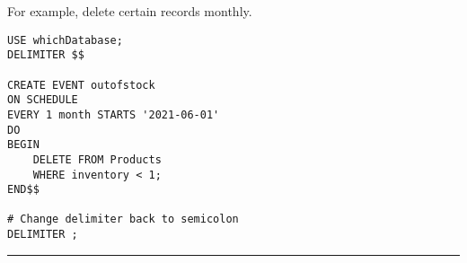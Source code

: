 \documentclass{article}
\begin{document}
\noindent For example, delete certain records monthly.

\begin{lstlisting}[frame=single]  
USE whichDatabase;
DELIMITER $$

CREATE EVENT outofstock
ON SCHEDULE 
EVERY 1 month STARTS '2021-06-01'
DO 
BEGIN
	DELETE FROM Products 
	WHERE inventory < 1;
END$$

# Change delimiter back to semicolon
DELIMITER ;
\end{lstlisting} 




\hspace{-0.5cm}\rule[-0.101in]{\textwidth}{0.0025in}



  



 
\end{document}

